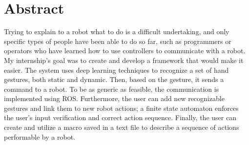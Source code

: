 \documentclass[../thesis.tex]{subfiles}
\begin{document}
    \cleardoublepage
    \begingroup
    \let\clearpage\relax
    \let\cleardoublepage\relax

    \chapter*{Abstract}
    Trying to explain to a robot what to do is a difficult undertaking, and only specific types of people have been able to do so far, such as programmers or operators who have learned how to use controllers to communicate with a robot. My internship's goal was to create and develop a framework that would make it easier. The system uses deep learning techniques to recognize a set of hand gestures, both static and dynamic. Then, based on the gesture, it sends a command to a robot. To be as generic as feasible, the communication is implemented using ROS. Furthermore, the user can add new recognizable gestures and link them to new robot actions; a finite state automaton enforces the user's input verification and correct action sequence. Finally, the user can  create and utilize a macro saved in a text file to describe a sequence of actions performable by a robot.

    \endgroup

    \vfill
\end{document}
